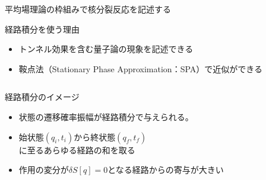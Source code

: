 \documentclass[14pt,aspectratio=169,xcolor=dvipsnames,table,dvipdfmx]{beamer}
\theoremstyle{definition}
\begin{document}
\begin{frame}{平均場理論の枠組みで核分裂反応を記述する}
  \begin{block}{経路積分を使う理由}
    \begin{itemize}
      \item トンネル効果を含む量子論の現象を記述できる
      \item 鞍点法（Stationary Phase Approximation：SPA）で近似ができる
    \end{itemize}
  \end{block}
  \begin{columns}[t]
    \begin{column}{.53\textwidth}
      \vspace{-5mm}
      \begin{exampleblock}{経路積分のイメージ}
        \begin{itemize}
          \item 状態の遷移確率振幅が経路積分で与えられる。
          \item 始状態$(q_i,t_i)$から終状態$(q_f,t_f)$\\に至るあらゆる経路の和を取る
          \item 作用の変分が$\delta S[q]=0$となる経路からの寄与が大きい
        \end{itemize}
      \end{exampleblock}
    \end{column}
    \begin{column}{.44\textwidth}
    \end{column}
  \end{columns}

\end{frame}
\end{document}
